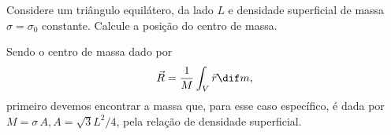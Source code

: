 \documentclass[]{IMTexam}
\author{Isabella B.}
\date{}
\begin{document}
\maketitle

\begin{questions}

	\question Considere um triângulo equilátero, da lado $ L $ e densidade superficial de massa $ \sigma = \sigma_0 $ constante. Calcule a posição do centro de massa.

	\begin{solution}
		Sendo o centro de massa dado por
		\begin{equation}\label{eq:Cmass}
			\vec{R}=\dfrac{1}{M}\int_{V}\vec{r}\dif m,
		\end{equation}
		primeiro devemos encontrar a massa que, para esse caso específico, é dada por $ M=\sigma\,A,A=\sqrt{3}L^{2}/4 $, pela relação de densidade superficial.


\end{solution}
\end{questions}
\end{document}
